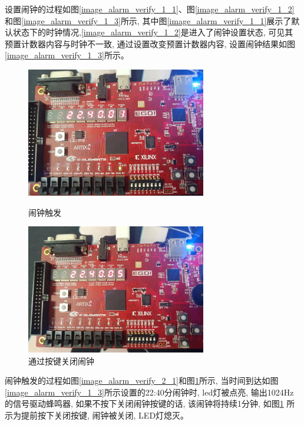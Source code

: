 \documentclass{article}
\begin{document}
设置闹钟的过程如图\ref{image_alarm_verify_1_1}、图\ref{image_alarm_verify_1_2}和图\ref{image_alarm_verify_1_3}所示, 
其中图\ref{image_alarm_verify_1_1}展示了默认状态下的时钟情况,\ref{image_alarm_verify_1_2}是进入了闹钟设置状态, 可见其
预置计数器内容与时钟不一致, 通过设置改变预置计数器内容, 设置闹钟结果如图\ref{image_alarm_verify_1_3}所示。\\
\begin{figure}[H]
    \begin{minipage}[t]{0.45\linewidth}
        \centering
        \includegraphics[width=0.7\textwidth]{image/2024-06-26-09-09-13.png}
        \caption{闹钟触发}
        \label{image_alarm_verify_2_1}
    \end{minipage}
    \begin{minipage}[t]{0.45\linewidth}
        \centering
        \includegraphics[width=0.7\textwidth]{image/2024-06-26-09-09-39.png}
        \caption{通过按键关闭闹钟}
        \label{image_alarm_verify_2_2}
    \end{minipage}
\end{figure}
闹钟触发的过程如图\ref{image_alarm_verify_2_1}和图\ref{image_alarm_verify_2_2}所示, 当时间到达如图\ref{image_alarm_verify_1_3}所示设置的22:40分闹钟时,
led灯被点亮, 输出1024Hz的信号驱动蜂鸣器, 如果不按下关闭闹钟按键的话, 该闹钟将持续1分钟, 如图\ref{image_alarm_verify_2_2}
所示为提前按下关闭按键, 闹钟被关闭, LED灯熄灭。 
\end{document}

